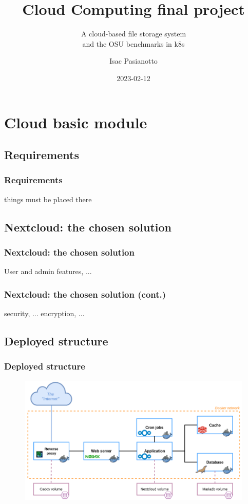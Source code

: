 \documentclass{beamer}
\author{}
\subtitle{}
\title{\insertsection}
\date{}
\title[Cloud Computing final project]{\Huge{Cloud Computing final project}}
\subtitle{A cloud-based file storage system \\ and the OSU benchmarks in k8s}
\author{Isac Pasianotto}
\date{2023-02-12}
\begin{document}
\begin{frame}
    \titlepage
\end{frame}

\section{Cloud \textbf{basic} module}
\subsection{Requirements}

\begin{frame}
    \frametitle{Requirements}
    things must be placed there
\end{frame}

\subsection{Nextcloud: the chosen solution}
\begin{frame}
    \frametitle{Nextcloud: the chosen solution}
    User and admin features, ...
\end{frame}

\begin{frame}
    \frametitle{Nextcloud: the chosen solution (cont.)}
    security, ...
    encryption, ...
\end{frame}

\subsection{Deployed structure}
\begin{frame}
    \frametitle{Deployed structure}
    \begin{figure}
        \includegraphics[width=\textwidth]{images/other/exbasediagram}
    \end{figure}
\end{frame}
\end{document}
